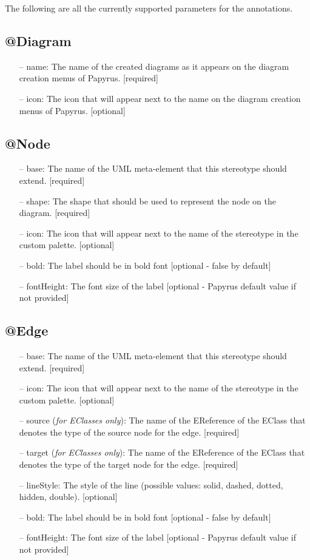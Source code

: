 \label{appendixA}
The following are all the currently supported parameters for the annotations.

\subsection{@Diagram}
\begin{itemize}
	\item[--] name: The name of the created diagrams as it appears on the diagram creation menus of Papyrus. [required]
	\item[--] icon: The icon that will appear next to the name on the diagram creation menus of Papyrus. [optional]
\end{itemize}

\subsection{@Node}
\begin{itemize}
	\item[--] base: The name of the UML meta-element that this stereotype should extend. [required]
	\item[--] shape: The shape that should be used to represent the node on the diagram. [required]		
	\item[--] icon: The icon that will appear next to the name of the stereotype in the custom palette. [optional]
	\item[--] bold: The label should be in bold font [optional - false by default]		
	\item[--] fontHeight: The font size of the label [optional - Papyrus default value if not provided]
\end{itemize}

\subsection{@Edge}
\begin{itemize}
	\item[--] base: The name of the UML meta-element that this stereotype should extend. [required]
	\item[--] icon: The icon that will appear next to the name of the stereotype in the custom palette. [optional]
	\item[--] source (\textit{for EClasses only}): The name of the EReference of the EClass that denotes the type of the source node for the edge. [required]
	\item[--] target (\textit{for EClasses only}): The name of the EReference of the EClass that denotes the type of the target node for the edge. [required]
	\item[--] lineStyle: The style of the line (possible values: solid, dashed, dotted, hidden, double). [optional]
	\item[--] bold: The label should be in bold font [optional - false by default]		
	\item[--] fontHeight: The font size of the label [optional - Papyrus default value if not provided]
\end{itemize}